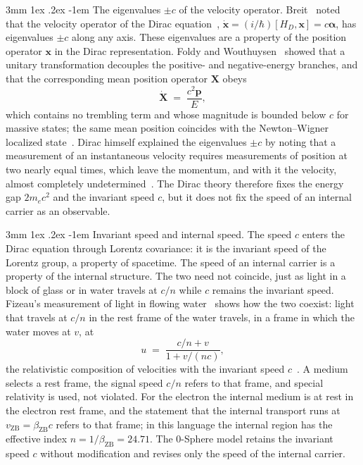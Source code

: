 \documentclass[%
 reprint, amsmath,amssymb, aps, prb, ]{revtex4-2}
\makeatletter
\numberwithin{equation}{section}
\renewcommand\paragraph{%
  \@startsection{paragraph}{4}{\z@}%
    {3mm \@plus 1ex \@minus .2ex}%
    {-1em}%
    {\normalfont\normalsize\itshape}}
\makeatother
\begin{document}
\paragraph{The eigenvalues $\pm c$ of the velocity operator.} Breit~\cite{Breit1928} noted that the velocity operator of the Dirac equation~\cite{Dirac1928}, $\dot{\bm{x}} = (i/\hbar)[H_D,\bm{x}] = c\bm{\alpha}$, has eigenvalues $\pm c$ along any axis. These eigenvalues are a property of the position operator $\bm{x}$ in the Dirac representation. Foldy and Wouthuysen~\cite{FW1950} showed that a unitary transformation decouples the positive- and negative-energy branches, and that the corresponding mean position operator $\bm{X}$ obeys
\begin{equation}
\dot{\bm{X}} \;=\; \frac{c^2\bm{p}}{E},
\label{eq:FW51}
\end{equation}
which contains no trembling term and whose magnitude is bounded below $c$ for massive states; the same mean position coincides with the Newton--Wigner localized state~\cite{NW1949}. Dirac himself explained the eigenvalues $\pm c$ by noting that a measurement of an instantaneous velocity requires measurements of position at two nearly equal times, which leave the momentum, and with it the velocity, almost completely undetermined~\cite{DiracPrinciples}. The Dirac theory therefore fixes the energy gap $2m_ec^2$ and the invariant speed $c$, but it does not fix the speed of an internal carrier as an observable.

\paragraph{Invariant speed and internal speed.} The speed $c$ enters the Dirac equation through Lorentz covariance: it is the invariant speed of the Lorentz group, a property of spacetime. The speed of an internal carrier is a property of the internal structure. The two need not coincide, just as light in a block of glass or in water travels at $c/n$ while $c$ remains the invariant speed. Fizeau's measurement of light in flowing water~\cite{Fizeau1851} shows how the two coexist: light that travels at $c/n$ in the rest frame of the water travels, in a frame in which the water moves at $v$, at
\begin{equation}
u \;=\; \frac{c/n + v}{1 + v/(nc)},
\label{eq:fizeau51}
\end{equation}
the relativistic composition of velocities with the invariant speed $c$~\cite{Laue1907}. A medium selects a rest frame, the signal speed $c/n$ refers to that frame, and special relativity is used, not violated. For the electron the internal medium is at rest in the electron rest frame, and the statement that the internal transport runs at $v_{\mathrm{ZB}} = \beta_{\mathrm{ZB}}c$ refers to that frame; in this language the internal region has the effective index $n = 1/\beta_{\mathrm{ZB}} = 24.71$. The 0-Sphere model retains the invariant speed $c$ without modification and revises only the speed of the internal carrier.
\end{document}
